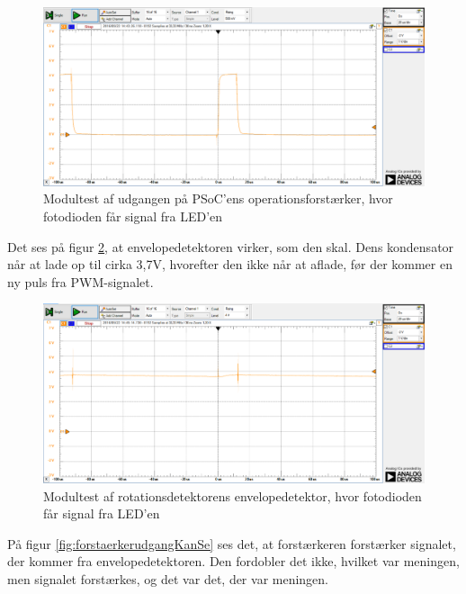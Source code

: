 \begin{figure}[H]
	\centering
	\includegraphics[width=\textwidth]{Test/images/AffyringTest/KanSe/udgang_opamp_psoc}
	\caption{Modultest af udgangen på PSoC'ens operationsforstærker, hvor fotodioden får signal fra LED'en}
	\label{fig:udgangOpAmpKanSe}
\end{figure}

Det ses på figur \ref{fig:envdetKanSe}, at envelopedetektoren virker, som den skal. Dens kondensator når at lade op til cirka 3,7V, hvorefter den ikke når at aflade, før der kommer en ny puls fra PWM-signalet. 

\begin{figure}[H]
	\centering
	\includegraphics[width=\textwidth]{Test/images/AffyringTest/KanSe/envelopedetektor}
	\caption{Modultest af rotationsdetektorens envelopedetektor, hvor fotodioden får signal fra LED'en}
	\label{fig:envdetKanSe}
\end{figure}

På figur \ref{fig:forstaerkerudgangKanSe} ses det, at forstærkeren forstærker signalet, der kommer fra envelopedetektoren. Den fordobler det ikke, hvilket var meningen, men signalet forstærkes, og det var det, der var meningen. 

